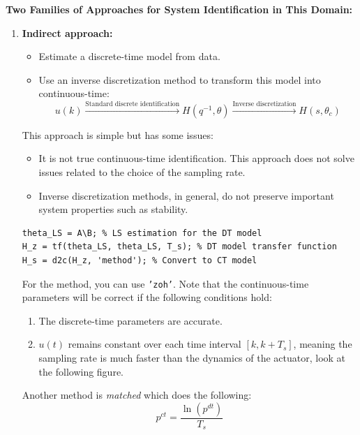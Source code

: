 \textbf{Two Families of Approaches for System Identification in This Domain:}
\begin{enumerate}
    \item \textbf{Indirect approach:}\\
    
    \begin{itemize}
        \item Estimate a discrete-time model from data.
        \item Use an inverse discretization method to transform this model into continuous-time:
        \[
        u(k) \xrightarrow{\text{Standard discrete identification}} H(q^{-1}, \theta) \xrightarrow{\text{Inverse discretization}} H(s, \theta_c)
        \]
    \end{itemize}
    This approach is simple but has some issues:
    \begin{itemize}
        \item It is not true continuous-time identification. This approach does not solve issues related to the choice of the sampling rate.
        \item Inverse discretization methods, in general, do not preserve important system properties such as stability.
    \end{itemize}

\begin{example}
\begin{verbatim}
theta_LS = A\B; % LS estimation for the DT model
H_z = tf(theta_LS, theta_LS, T_s); % DT model transfer function
H_s = d2c(H_z, 'method'); % Convert to CT model
\end{verbatim}

For the method, you can use \texttt{'zoh'}. Note that the continuous-time parameters will be correct if the following conditions hold:

\begin{enumerate}
    \item The discrete-time parameters are accurate.
    \item \(u(t)\) remains constant over each time interval \([k, k+T_s]\), meaning the sampling rate is much faster than the dynamics of the actuator, look at the following figure.
\end{enumerate}

Another method is \textit{matched} which does the following:
\[
p^{ct} = \frac{\ln(p^{dt})}{T_s}
\]
\end{example}


\end{enumerate}
